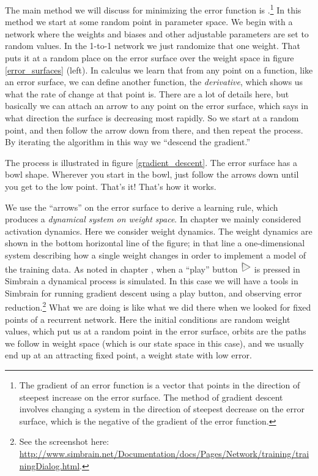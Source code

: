 The main method we will discuss for minimizing the error function is  .\footnote{The gradient of an error function is a vector that points in the direction of steepest increase on the error surface. The method of gradient descent involves changing a system in the direction of steepest decrease on the error surface, which is the negative of the gradient of the error function.}  In this method we start at some random point in parameter space. We begin with a network where the weights and biases and other adjustable parameters are set to random values. In the 1-to-1 network we just randomize that one weight. That puts it at a random place on the error surface over the weight space in figure \ref{error_surfaces} (left). In calculus we learn that from any point on a function, like an error surface, we can define another function, the \emph{derivative}, which shows us what the rate of change at that point is. There are a lot of details here, but basically we can attach an arrow to any point on the error surface, which says in what direction the surface is decreasing most rapidly. So we start at a random point, and then follow the arrow down from there, and then repeat the process. By iterating the algorithm in this way we ``descend the gradient.''

The process is illustrated in figure \ref{gradient_descent}. The error surface has a bowl shape. Wherever you start in the bowl, just follow the arrows down until you get to the low point. That's it!  That's how it works. 

We use the ``arrows'' on the error surface to derive a learning rule, which produces a \emph{dynamical system on weight space}. In chapter  we mainly considered activation dynamics. Here we consider weight dynamics. The weight dynamics are shown in the bottom horizontal line of the figure; in that line a one-dimensional system describing how a single weight changes in order to implement a model of the training data. As noted in chapter , when a ``play''  button \includegraphics[scale=.5]{./images/Play.png} is pressed in Simbrain  a dynamical process is simulated. In this case we will have a tools in Simbrain for running gradient descent using a play button, and observing error reduction.\footnote{See the screenshot here: \url{http://www.simbrain.net/Documentation/docs/Pages/Network/training/trainingDialog.html}.} What we are doing is like what we did there when we looked for fixed points of a recurrent network. Here the initial conditions are random weight values, which put us at a random point in the error surface, orbits are the paths we follow in weight space (which is our state space in this case), and we usually end up  at an attracting fixed point, a weight state with low error. 

